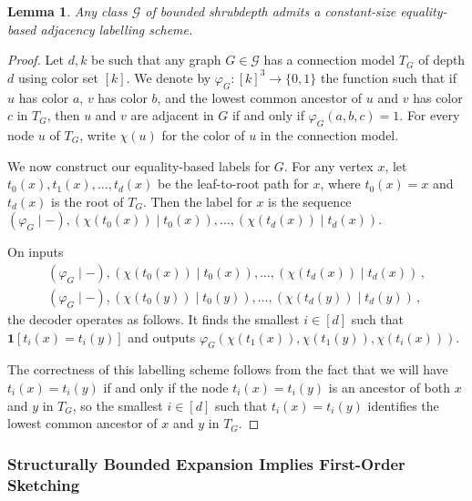 \documentclass[11pt]{article}
\newtheorem{lemma}[thm]{Lemma}
\theoremstyle{definition}
\newcommand{\ind}[1]{\mathbf{1}[ #1 ]}
\begin{document}
\begin{lemma}\label{adj:shrubdepth}
\label{lemma:shrubdepth}
Any class $\mathcal G$ of bounded shrubdepth admits a constant-size equality-based adjacency
labelling scheme.
\end{lemma}
\begin{proof}
Let $d,k$ be such that any graph $G\in \mathcal{G}$ has a connection model $T_G$ of depth $d$ using
color set $[k]$. We denote by $\varphi_G:[k]^3\to \{0,1\}$ the function such that if $u$ has color
$a$, $v$ has color $b$, and the lowest common ancestor of $u$ and $v$ has color $c$ in $T_G$, then
$u$ and $v$ are adjacent in $G$ if and only if $\varphi_G(a,b,c)=1$. For every node $u$ of $T_G$,
write $\chi(u)$ for the color of $u$ in the connection model.

We now construct our equality-based labels for $G$. For any vertex $x$, let $t_0(x), t_1(x), \dotsc,
t_d(x)$ be the leaf-to-root path for $x$, where $t_0(x)=x$ and $t_d(x)$ is the root of $T_G$. Then the
label for $x$ is the sequence $(\varphi_G \mid -), (\chi(t_0(x)) \mid t_0(x)), \dotsc, (\chi(t_d(x))
\mid t_d(x))$.

On inputs
\begin{align*}
(\varphi_G \mid -), (\chi(t_0(x)) \mid t_0(x)), \dotsc, (\chi(t_d(x)) \mid t_d(x)) \,,\\
(\varphi_G \mid -), (\chi(t_0(y)) \mid t_0(y)), \dotsc, (\chi(t_d(y)) \mid t_d(y)) \,,
\end{align*}
the decoder operates as follows. It finds the smallest $i \in [d]$ such that $\ind{t_i(x)=t_i(y)}$
and outputs $\varphi_G(\chi(t_1(x)), \chi(t_1(y)), \chi(t_i(x)))$.

The correctness of this labelling scheme follows from the fact that we will have $t_i(x) = t_i(y)$
if and only if the node $t_i(x) = t_i(y)$ is an ancestor of both $x$ and $y$ in $T_G$, so the smallest
$i \in [d]$ such that $t_i(x)=t_i(y)$ identifies the lowest common
ancestor of $x$ and $y$  in $T_G$.
\end{proof}

\subsubsection{Structurally Bounded Expansion Implies First-Order Sketching}
\end{document}
